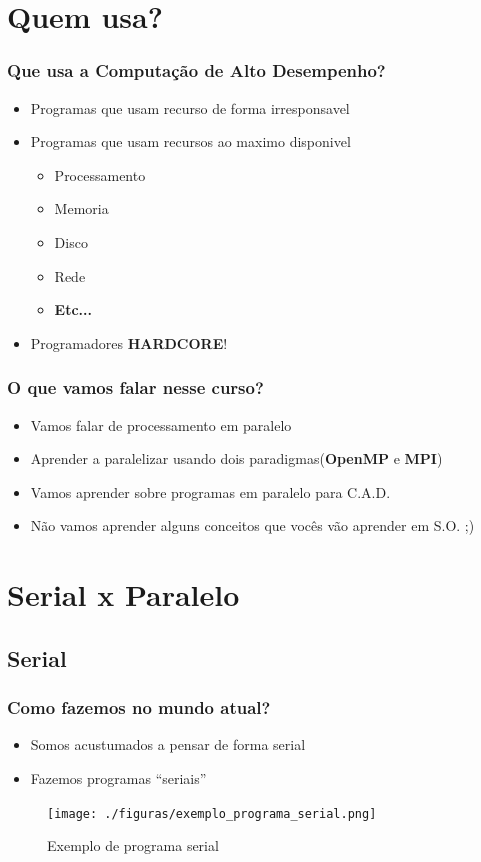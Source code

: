 \documentclass[10pt]{beamer}
\begin{document}
\section{Quem usa?}
	\begin{frame}
	\frametitle{Que usa a Computação de Alto Desempenho?}
		\begin{itemize}
			\item Programas que usam recurso de forma irresponsavel
			\pause
			\item Programas que usam recursos ao maximo disponivel
			\pause
			\begin{itemize}
				\item Processamento
				\item Memoria
				\item Disco
				\item Rede
				\item \textbf{Etc...}
			\end{itemize}
			\pause
			\item Programadores \textbf{HARDCORE}!
		\end{itemize}
	\end{frame}

	\begin{frame}%
	\frametitle{O que vamos falar nesse curso?}
		\begin{itemize}[<-+>]
			\item Vamos falar de processamento em paralelo
			\item Aprender a paralelizar usando dois paradigmas(\textbf{OpenMP} e \textbf{MPI})
			\item Vamos aprender sobre programas em paralelo para C.A.D.
			\item Não vamos aprender alguns conceitos que vocês vão aprender em S.O. ;)
		\end{itemize}
	\end{frame}

\section{Serial x Paralelo}
	\subsection{Serial}
		\begin{frame}%
		\frametitle{Como fazemos no mundo atual?}
			\begin{itemize}
				\item Somos acustumados a pensar de forma serial
				\item Fazemos programas ``seriais''
			\end{itemize}
			\begin{figure}
			\centering
				\texttt{[image: ./figuras/exemplo\_programa\_serial.png]}
				\caption{Exemplo de programa serial}
			\end{figure}
		\end{frame}
\end{document}

